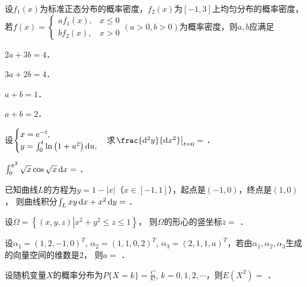 \documentclass[plain,noanswer,medmath]{../../template/jnuexam}
\begin{document}
\begin{problem}
设$f_1(x)$为标准正态分布的概率密度，$f_2(x)$为$\left[- 1,3 \right]$上均匀分布的概率密度，若$f(x) = \begin{cases}
  af_1(x), & x \le 0 \\
  bf_2(x), & x > 0
\end{cases}$$(a > 0,b > 0)$为概率密度，则$a,b$应满足\pickout{}
\begin{abcd}
\item $2a + 3b = 4$．
\item $3a + 2b = 4$．
\item $a + b = 1$．
\item $a + b = 2$．
\end{abcd}
\end{problem}




\begin{problem}
设$\begin{cases}
  x = \mathrm{e}^{- t}, \\
  y = \int_0^t \ln \left(1 + u^2 \right)\mathop{}\!\mathrm{d} u,
\end{cases}$求$\left. \frac{\d^2y}{\dx^2} \right|_{t = 0} =$ \fillin{}．
\end{problem}


\begin{problem}
$\int_0^{\pi^2} \sqrt{x} \cos \sqrt{x} \mathop{}\!\mathrm{d} x =$ \fillin{}．
\end{problem}


\begin{problem}
已知曲线$L$的方程为$y = 1 - |x|$（$x\in[-1,1]$），起点是$(- 1,0)$，终点是$(1,0)$，
则曲线积分$\int_L xy\mathop{}\!\mathrm{d} x + x^2 \mathop{}\!\mathrm{d} y =$ \fillin{}．
\end{problem}


\begin{problem}
设$\Omega = \left\{\left(x,y,z \right)\left| x^2 + y^2 \le z \le 1 \right. \right\}$，
则$\Omega$的形心的竖坐标$\overline{z} =$ \fillin{}．
\end{problem}


\begin{problem}
设$\alpha_1 = \left(1,2, - 1,0 \right)^T$, $\alpha_2 = \left(1,1,0,2 \right)^T$,
$\alpha_3 = \left(2,1,1,a \right)^T$，若由$\alpha_1,\alpha_2,\alpha_3$生成的向量空间的维数是$2$，
则$a =$ \fillin{}．
\end{problem}


\begin{problem}
设随机变量$X$的概率分布为$P\{X=k\} = \frac{C}{k!}$, $k=0,1,2,\cdots$，则$E\left(X^2\right)=$ \fillin{}．
\end{problem}
\end{document}
